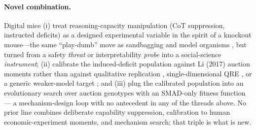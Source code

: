 \paragraph{Novel combination.}
Digital mice (i) treat reasoning-capacity manipulation (CoT
suppression, instructed deficits) as a designed experimental variable
in the spirit of a knockout mouse---the same ``play-dumb'' move as
sandbagging \citep{vanderweij2024sandbagging} and model organisms
\citep{turner2025modelorganisms}, but turned from a safety \emph{threat}
or interpretability \emph{probe} into a social-science \emph{instrument};
(ii) calibrate the induced-deficit population against Li (2017) auction
moments rather than against qualitative replication
\citep{horton2023silicus}, single-dimensional QRE \citep{pechon2026qre},
or a generic weaker-model target \citep{greenblatt2024password}; and
(iii) plug the calibrated population into an evolutionary search over
auction genotypes with an SMAD-only fitness function --- a
mechanism-design loop with no antecedent in any of the threads above.
No prior line combines deliberate capability suppression, calibration to
human economic-experiment moments, and mechanism search; that triple is
what is new.

